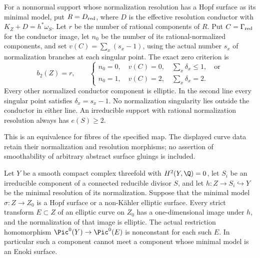 \begin{proposition}
For a nonnormal support whose normalization resolution
has a Hopf surface as its minimal model, put $R=D_{\rm red}$,
where $D$ is the effective
resolution conductor with $K_Z+D=h^*\omega_S$. Let $r$ be
the number of rational components of $R$. Put
$C=\Gamma_{\rm red}$ for the conductor image, let $n_0$ be
the number of its rational-normalized components, and set
$v(C)=\sum_x(s_x-1)$, using the actual number $s_x$ of
normalization branches at each singular point. The exact
zero criterion is
\[
 b_2(Z)=r,\qquad
 \begin{cases}
 n_0=0,\quad v(C)=0,\quad\sum_x\delta_x\le1,\quad\text{or}\\
 n_0=1,\quad v(C)=2,\quad\sum_x\delta_x=2.
 \end{cases}                                                   \tag{C.IZ.2}\label{cdp:eq:C.IZ.2}
\]
Every other normalized conductor component is elliptic.
In the second line every singular point satisfies
$\delta_x=s_x-1$. No normalization singularity lies outside
the conductor in either line. An irreducible support with
rational normalization resolution always has $e(S)\ge2$.

This is an equivalence for fibres of the specified map.
The displayed curve data retain their normalization and
resolution morphisms; no assertion of smoothability of
arbitrary abstract surface gluings is included.
\end{proposition}

\begin{proposition}\label{cdp:st:C.2.INT.1}


Let $Y$ be a smooth compact complex threefold with
$H^2(Y,\Q)=0$, let $S_i$ be an irreducible component of
a connected reducible divisor $S$, and let
$h:Z\to S_i\hookrightarrow Y$ be the minimal resolution
of its normalization. Suppose that the minimal model
$\sigma:Z\to Z_0$ is a Hopf surface or a non-K\"ahler
elliptic surface. Every strict transform $E\subset Z$ of
an elliptic curve on $Z_0$ has a one-dimensional image
under $h$, and the normalization of that image is elliptic.
The actual restriction homomorphism
$\Pic^0(Y)\to\Pic^0(E)$ is nonconstant for each such $E$.
In particular such a component cannot meet a component
whose minimal model is an Enoki surface.
\end{proposition}

